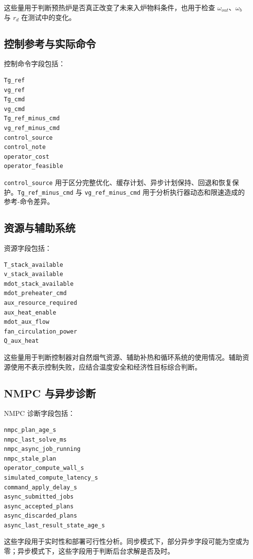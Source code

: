 \documentclass[UTF8,openany,zihao=-4,oneside]{ctexbook}
\providecommand{\passthrough}[1]{#1}
\begin{document}
这些量用于判断预热炉是否真正改变了未来入炉物料条件，也用于检查 \(\omega_{out}\)、\(\omega_b\) 与 \(r_d\) 在测试中的变化。

\subsection{控制参考与实际命令}\label{subsec:history-control-command}

控制命令字段包括：

\begin{lstlisting}
Tg_ref
vg_ref
Tg_cmd
vg_cmd
Tg_ref_minus_cmd
vg_ref_minus_cmd
control_source
control_note
operator_cost
operator_feasible
\end{lstlisting}

\passthrough{\lstinline!control_source!} 用于区分完整优化、缓存计划、异步计划保持、回退和恢复保护。\passthrough{\lstinline!Tg_ref_minus_cmd!} 与 \passthrough{\lstinline!vg_ref_minus_cmd!} 用于分析执行器动态和限速造成的参考-命令差异。

\subsection{资源与辅助系统}\label{subsec:history-resource}

资源字段包括：

\begin{lstlisting}
T_stack_available
v_stack_available
mdot_stack_available
mdot_preheater_cmd
aux_resource_required
aux_heat_enable
mdot_aux_flow
fan_circulation_power
Q_aux_heat
\end{lstlisting}

这些量用于判断控制器对自然烟气资源、辅助补热和循环系统的使用情况。辅助资源使用不表示控制失败，应结合温度安全和经济性目标综合判断。

\subsection{NMPC 与异步诊断}\label{subsec:history-nmpc-diagnostics}

NMPC 诊断字段包括：

\begin{lstlisting}
nmpc_plan_age_s
nmpc_last_solve_ms
nmpc_async_job_running
nmpc_stale_plan
operator_compute_wall_s
simulated_compute_latency_s
command_apply_delay_s
async_submitted_jobs
async_accepted_plans
async_discarded_plans
async_last_result_state_age_s
\end{lstlisting}

这些字段用于实时性和部署可行性分析。同步模式下，部分异步字段可能为空或为零；异步模式下，这些字段用于判断后台求解是否及时。
\end{document}
